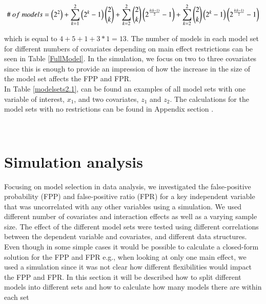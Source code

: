 \begin{equation*}
\centering
\#\ of\ models=\left(2^2\right)+
\sum^2_{k=1}{\left(2^k-1\right) \binom{2}{k}}+
\sum^2_{k=2}{\binom{2}{k}\left(2^{\frac{k\left(k-1\right)}{2}}-1\right)}+  
\sum^2_{k=2}{\binom{2}{k}\left(2^k-1\right)\left(2^{\frac{k\left(k-1\right)}{2}}-1\right)}
\end{equation*}

which is equal to $4+5+1+3*1=13$. The number of models in each model set for different numbers of covariates depending on main effect restrictions can be seen in Table \ref{FullModel}. In the simulation, we focus on two to three covariates since this is enough to provide an impression of how the increase in the size of the model set affects the FPP and FPR.  \\


In Table \ref{modelsets2.1}, can be found an examples of all model sets with one variable of interest, $x_{1}$, and two covariates, $z_{1}$ and $z_{2}$. The calculations for the model sets with no restrictions can be found in Appendix section .


 \\
 
\section{Simulation analysis}
Focusing on model selection in data analysis, we investigated the false-positive probability (FPP) and false-positive ratio (FPR) for a key independent variable that was uncorrelated with any other variables using a simulation. We used different number of covariates and interaction effects as well as a varying sample size. The effect of the different model sets were tested using different correlations between the dependent variable and covariates, and different data structures. Even though in some simple cases it would be possible to calculate a closed-form solution for the FPP and FPR e.g., when looking at only one main effect, we used a simulation since it was not clear how different flexibilities would impact the FPP and FPR. In this section it will be described how to split different models into different sets and how to calculate how many models there are within each set\\


